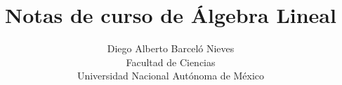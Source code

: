\documentclass[12pt,libertine]{book}
\begin{document}
\title{Notas de curso de Álgebra Lineal}
\author{Diego Alberto Barceló Nieves\\  Facultad de Ciencias \\ Universidad Nacional Autónoma de México}
\date{}%
\maketitle



\end{document}
